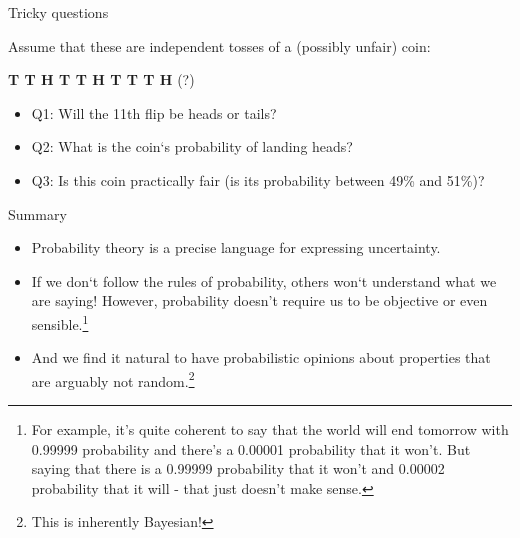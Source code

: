 \begin{frame}{Tricky questions}

Assume that these are independent tosses of a (possibly unfair) coin:

\begin{center}
\textbf{T  T  H  T  T  H  T  T  T  H} {\color{red}(?)}
\end{center}

\begin{small}
\bigskip
\begin{itemize}
\item {\color{red} Q1:} Will the 11th flip be heads or tails?\pause
\item {\color{red} Q2:} What is the coin‘s probability of landing heads?\pause
\item {\color{red} Q3:} Is this coin practically fair (is its probability between 49\% and 51\%)?
\end{itemize}
\end{small}
\bigskip
\end{frame}


\begin{frame}{Summary}

\begin{itemize}
\item Probability theory is a precise language for expressing uncertainty.
\item If we don‘t follow the rules of probability, others won‘t understand what we are saying! However, probability doesn't require us to be objective or even sensible.\footnote{For example, it's quite coherent to say that the world will end tomorrow with 0.99999 probability and there's a 0.00001 probability that it won't. But saying that there is a 0.99999 probability that it won't and 0.00002 probability that it will - that just doesn't make sense.}
\item And we find it natural to have probabilistic opinions about properties that are arguably not random.\footnote{This is inherently Bayesian!}
\end{itemize}
\end{frame}

